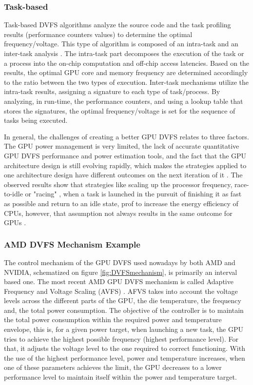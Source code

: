 \subsubsection{Task-based}

Task-based DVFS algorithms analyze the source code and the task profiling results (performance counters values) to determine the optimal frequency/voltage. This type of algorithm is composed of an intra-task and an inter-task analysis \cite{noauthor_time_nodate}. The intra-task part decomposes the execution of the task or a process into the on-chip computation and off-chip access latencies. Based on the results,  the optimal GPU core and memory frequency are determined accordingly to the ratio between the two types of execution. Inter-task mechanisms utilize the intra-task results, assigning a signature to each type of task/process. By analyzing, in run-time, the performance counters, and using a lookup table that stores the signatures, the optimal frequency/voltage is set for the sequence of tasks being executed.

In general, the challenges of creating a better GPU DVFS relates to three factors. The GPU power management is very limited, the lack of accurate quantitative GPU DVFS performance and power estimation tools, and the fact that the GPU architecture design is still evolving rapidly, which makes the strategies applied to one architecture design have different outcomes on the next iteration of it \cite{mei_survey_2016}. The observed results show that strategies like scaling up the processor frequency, race-to-idle  \cite{hoffmann_racing_2013} or "racing" \cite{kim_racing_2015}, when a task is launched in the pursuit of finishing it as fast as possible and return to an idle state, prof to increase the energy efficiency of CPUs, however, that assumption not always results in the same outcome for GPUs \cite{kim_racing_2015}. 

\subsubsection{AMD DVFS Mechanism Example}

The control mechanism of the GPU DVFS used nowadays by both AMD and NVIDIA, schematized on figure \ref{fig:DVFSmechanism}, is primarily an interval based one. The most recent AMD GPU DVFS mechanism is called Adaptive Frequency and Voltage Scaling (AVFS) \cite{amd_polaris_2017}. AFVS takes into account the voltage levels across the different parts of the GPU, the die temperature, the frequency and, the total power consumption. The objective of the controller is to maintain the total power consumption within the required power and temperature envelope, this is, for a given power target, when launching a new task, the GPU tries to achieve the highest possible frequency (highest performance level). For that, it adjusts the voltage level to the one required to correct functioning. With the use of the highest performance level, power and temperature increases, when one of these parameters achieves the limit, the GPU decreases to a lower performance level to maintain itself within the power and temperature target. 

